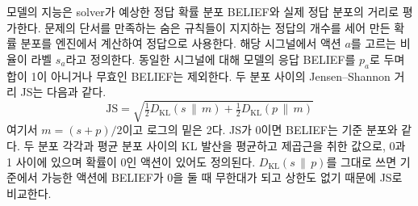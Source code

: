 모델의 지능은 solver가 예상한 정답 확률 분포 BELIEF와 실제 정답 분포의 거리로 평가한다. 문제의 단서를 만족하는 숨은 규칙들이 지지하는 정답의 개수를 세어 만든 확률 분포를 엔진에서 계산하여 정답으로 사용한다. 해당 시그널에서 액션 $a$를 고르는 비율이 라벨 $s_a$라고 정의한다. 동일한 시그널에 대해 모델의 응답 BELIEF를 $p_a$로 두며 합이 1이 아니거나 무효인 BELIEF는 제외한다. 두 분포 사이의 Jensen--Shannon 거리 JS는 다음과 같다.
\begin{equation}
\mathrm{JS}=\sqrt{\tfrac12 D_{\mathrm{KL}}(s\,\|\,m)+\tfrac12 D_{\mathrm{KL}}(p\,\|\,m)}
\label{eq:js}
\end{equation}
여기서 $m=(s+p)/2$이고 로그의 밑은 2다\citep{lin1991divergence,endres2003new}. JS가 0이면 BELIEF는 기준 분포와 같다. 두 분포 각각과 평균 분포 사이의 KL 발산을 평균하고 제곱근을 취한 값으로, 0과 1 사이에 있으며 확률이 0인 액션이 있어도 정의된다. $D_{\mathrm{KL}}(s\,\|\,p)$를 그대로 쓰면 기준에서 가능한 액션에 BELIEF가 0을 둘 때 무한대가 되고 상한도 없기 때문에 JS로 비교한다.

